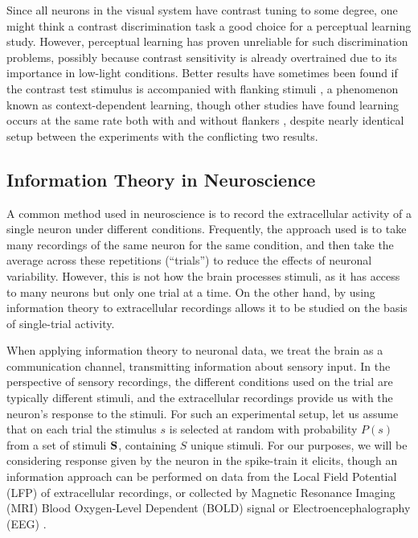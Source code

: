 Since all neurons in the visual system have contrast tuning to some degree, one might think a contrast discrimination task a good choice for a perceptual learning study. However, perceptual learning has proven unreliable for such discrimination problems, possibly because contrast sensitivity is already overtrained due to its importance in low-light conditions. Better results have sometimes been found if the contrast test stimulus is accompanied with flanking stimuli \cite{Adini2002}, a phenomenon known as context-dependent learning, though other studies have found learning occurs at the same rate both with and without flankers \cite{Yu2004}, despite nearly identical setup between the experiments with the conflicting two results.

\subsection{Information Theory in Neuroscience}
\label{sec:bgit}

A common method used in neuroscience is to record the extracellular activity of a single neuron under different conditions. Frequently, the approach used is to take many recordings of the same neuron for the same condition, and then take the average across these repetitions (``trials'') to reduce the effects of neuronal variability. However, this is not how the brain processes stimuli, as it has access to many neurons but only one trial at a time.
On the other hand, by using information theory to extracellular recordings allows it to be studied on the basis of single-trial activity.

When applying information theory to neuronal data, we treat the brain as a communication channel, transmitting information about sensory input. 
In the perspective of sensory recordings, the different conditions used on the trial are typically different stimuli, and the extracellular recordings provide us with the neuron's response to the stimuli.
For such an experimental setup, let us assume that on each trial the stimulus $s$ is selected at random with probability $P(s)$ from a set of stimuli $\mathbf{S}$, containing $S$ unique stimuli.
For our purposes, we will be considering response given by the neuron in the spike-train it elicits, though an information approach can be performed on data from the Local Field Potential (LFP) of extracellular recordings, or collected by Magnetic Resonance Imaging (MRI) Blood Oxygen-Level Dependent (BOLD) signal or Electroencephalography (EEG) \cite{Magri2009,Quiroga2009}.

